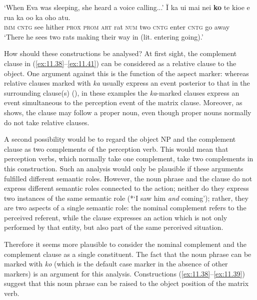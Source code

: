 \glt 
‘When Eva was sleeping, she heard a voice calling...’ \textstyleExampleref{[R210.180]} 
\z
{}
\ea\label{ex:11.41}
\gll {\ꞌ}Ī ka u{\ꞌ}i mai nei \textbf{ko} te kio{\ꞌ}e e rua ka o{\ꞌ}o ka oho atu. \\
\textsc{imm} \textsc{cntg} see hither \textsc{prox} \textsc{prom} \textsc{art} rat \textsc{num} two \textsc{cntg} enter \textsc{cntg} go away \\

\glt
‘There he sees two rats making their way in (lit. entering going).’ \textstyleExampleref{[R310.459]} 
\z

How should these constructions be analysed? At first sight, the complement clause in (\ref{ex:11.38}–\ref{ex:11.41}) can be considered as a relative clause to the object. One argument against this is the function of the aspect marker: whereas relative clauses marked with \textit{ka} usually express an event posterior to that in the surrounding clause(s) (), in these examples the \textit{ka}{}-marked clauses express an event simultaneous to the perception event of the matrix clause. Moreover, as  shows, the clause may follow a proper noun, even though proper nouns normally do not take relative clauses.

A second possibility would be to regard the object NP and the complement clause as two complements of the perception verb. This would mean that perception verbs, which normally take one complement, take two complements in this construction. Such an analysis would only be plausible if these arguments fulfilled different semantic roles. However, the noun phrase and the clause do not express different semantic roles connected to the action; neither do they express two instances of the same semantic role (*‘I saw him \textit{and} coming’); rather, they are two aspects of a single semantic role: the nominal complement refers to the perceived referent, while the clause expresses an action which is not only performed by that entity, but also part of the same perceived situation. 

Therefore it seems more plausible to consider the nominal complement and the complement clause as a single constituent. The fact that the noun phrase can be marked with \textit{ko} (which is the default case marker in the absence of other markers) is an argument for this analysis. Constructions (\ref{ex:11.38}–\ref{ex:11.39}) suggest that this noun phrase can be raised to the object position of the matrix verb.
